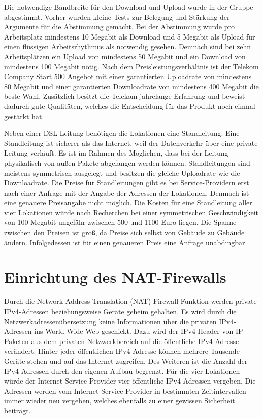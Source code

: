 \documentclass[fontsize=12pt,paper=a4,open=any,parskip=half,
  twoside=false,toc=listof,toc=bibliography,fleqn,leqno,
  captions=nooneline,captions=tableabove,british]{scrbook}
\begin{document}
Die notwendige Bandbreite für den Download und Upload wurde in der Gruppe abgestimmt. Vorher wurden kleine Tests zur Belegung und Stärkung der Argumente für die Abstimmung gemacht. Bei der Abstimmung wurde pro Arbeitsplatz mindestens 10 Megabit als Download und 5 Megabit als Upload für einen flüssigen Arbeitsrhythmus als notwendig gesehen. Demnach sind bei zehn Arbeitsplätzen ein Upload von mindestens 50 Megabit und ein Download von mindestens 100 Megabit nötig. Nach dem Preisleistungsverhältnis ist der Telekom Company Start 500 Angebot mit einer garantierten Uploadrate von mindestens 80 Megabit und einer garantierten Downloadrate von mindestens 400 Megabit die beste Wahl. Zusätzlich besitzt die Telekom jahrelange Erfahrung und beweist dadurch gute Qualitäten, welches die Entscheidung für das Produkt noch einmal gestärkt hat.\par
Neben einer DSL-Leitung benötigen die Lokationen eine Standleitung. Eine Standleitung ist sicherer als das Internet, weil der Datenverkehr über eine private Leitung verläuft. Es ist im Rahmen des Möglichen, dass bei der Leitung physikalisch von außen Pakete abgefangen werden können. Standleitungen sind meistens symmetrisch ausgelegt und besitzen die gleiche Uploadrate wie die Downloadrate. Die Preise für Standleitungen gibt es bei Service-Providern erst nach einer Anfrage mit der Angabe der Adressen der Lokationen. Demnach ist eine genauere Preisangabe nicht möglich. Die Kosten für eine Standleitung aller vier Lokationen würde nach Recherchen bei einer symmetrischen Geschwindigkeit von 100 Megabit ungefähr zwischen 500 und 1100 Euro liegen. Die Spanne zwischen den Preisen ist groß, da Preise sich selbst von Gebäude zu Gebäude ändern. Infolgedessen ist für einen genaueren Preis eine Anfrage unabdingbar.


\section{Einrichtung des NAT-Firewalls}
Durch die Network Address Translation (NAT) Firewall Funktion werden private IPv4-Adressen beziehungsweise Geräte geheim gehalten. Es wird durch die Netzwerkadressenübersetzung keine Informationen über die privaten IPv4-Adressen ins World Wide Web geschickt. Dazu wird der IPv4-Header von IP-Paketen aus dem privaten Netzwerkbereich auf die öffentliche IPv4-Adresse verändert. Hinter jeder öffentlichen IPv4-Adresse können mehrere Tausende Geräte stehen und auf das Internet zugreifen. Des Weiteren ist die Anzahl der IPv4-Adressen durch den eigenen Aufbau begrenzt. Für die vier Lokationen würde der Internet-Service-Provider vier öffentliche IPv4-Adressen vergeben. Die Adressen werden vom Internet-Service-Provider in bestimmten Zeitintervallen immer wieder neu vergeben, welches ebenfalls zu einer gewissen Sicherheit beiträgt.
\end{document}
